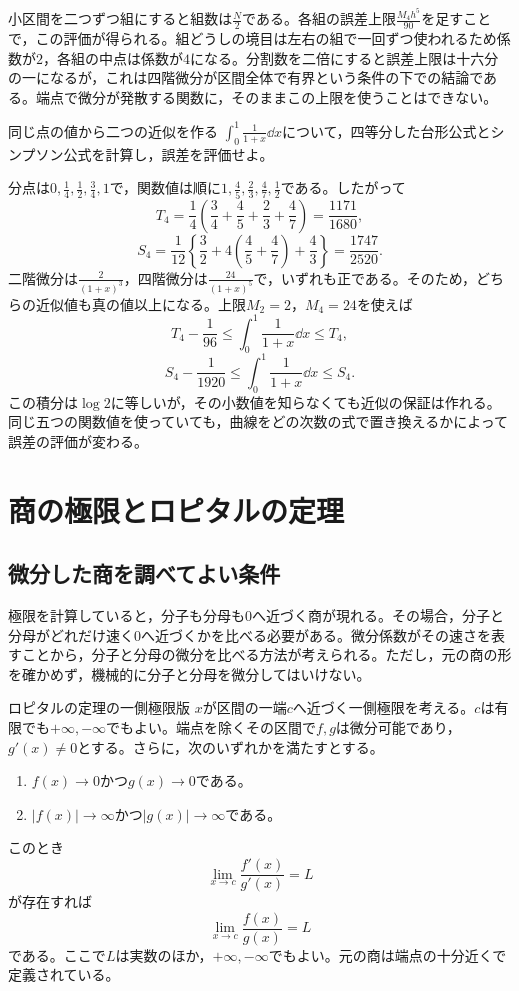 小区間を二つずつ組にすると組数は$\frac N2$である。各組の誤差上限$\frac{M_4h^5}{90}$を足すことで，この評価が得られる。組どうしの境目は左右の組で一回ずつ使われるため係数が$2$，各組の中点は係数が$4$になる。分割数を二倍にすると誤差上限は十六分の一になるが，これは四階微分が区間全体で有界という条件の下での結論である。端点で微分が発散する関数に，そのままこの上限を使うことはできない。

\begin{example}{同じ点の値から二つの近似を作る}
$\int_0^1\frac1{1+x}\dd x$について，四等分した台形公式とシンプソン公式を計算し，誤差を評価せよ。
\end{example}

分点は$0,\frac14,\frac12,\frac34,1$で，関数値は順に$1,\frac45,\frac23,\frac47,\frac12$である。したがって
\[
 T_4=\frac14\left(\frac34+\frac45+\frac23+\frac47\right)
 =\frac{1171}{1680},
\]
\[
 S_4=\frac1{12}\left\{\frac32+4\left(\frac45+\frac47\right)+\frac43\right\}
 =\frac{1747}{2520}.
\]
二階微分は$\frac2{(1+x)^3}$，四階微分は$\frac{24}{(1+x)^5}$で，いずれも正である。そのため，どちらの近似値も真の値以上になる。上限$M_2=2$，$M_4=24$を使えば
\[
 T_4-\frac1{96}\leq\int_0^1\frac1{1+x}\dd x\leq T_4,
\]
\[
 S_4-\frac1{1920}\leq\int_0^1\frac1{1+x}\dd x\leq S_4.
\]
この積分は$\log2$に等しいが，その小数値を知らなくても近似の保証は作れる。同じ五つの関数値を使っていても，曲線をどの次数の式で置き換えるかによって誤差の評価が変わる。

\section{商の極限とロピタルの定理}\label{節:ロピタル}

\subsection{微分した商を調べてよい条件}

極限を計算していると，分子も分母も$0$へ近づく商が現れる。その場合，分子と分母がどれだけ速く$0$へ近づくかを比べる必要がある。微分係数がその速さを表すことから，分子と分母の微分を比べる方法が考えられる。ただし，元の商の形を確かめず，機械的に分子と分母を微分してはいけない。

\begin{theorem}{ロピタルの定理の一側極限版}
$x$が区間の一端$c$へ近づく一側極限を考える。$c$は有限でも$+\infty,-\infty$でもよい。端点を除くその区間で$f,g$は微分可能であり，$g'(x)\ne0$とする。さらに，次のいずれかを満たすとする。
\begin{enumerate}[label=(\roman*),leftmargin=*]
 \item $f(x)\to0$かつ$g(x)\to0$である。
 \item $|f(x)|\to\infty$かつ$|g(x)|\to\infty$である。
\end{enumerate}
このとき
\[
 \lim_{x\to c}\frac{f'(x)}{g'(x)}=L
\]
が存在すれば
\[
 \lim_{x\to c}\frac{f(x)}{g(x)}=L
\]
である。ここで$L$は実数のほか，$+\infty,-\infty$でもよい。元の商は端点の十分近くで定義されている。
\end{theorem}

